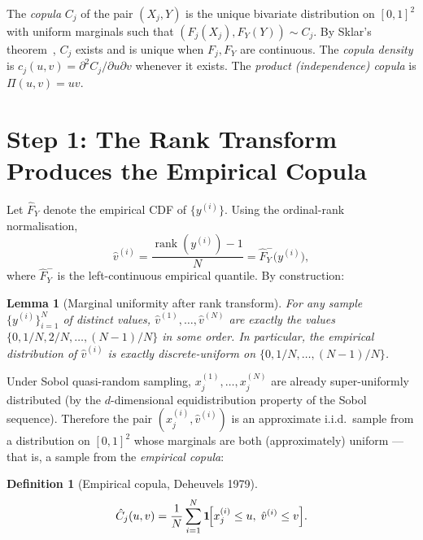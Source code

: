 \documentclass[11pt,a4paper]{article}
\newtheorem{lemma}[theorem]{Lemma}
\theoremstyle{definition}
\newtheorem{definition}[theorem]{Definition}
\newcommand{\Ind}{\mathbf{1}}
\DeclareMathOperator{\rank}{rank}
\begin{document}
\begin{tcolorbox}[colback=blue!4, colframe=blue!30, title=Notation for copulas]
The \emph{copula} $C_j$ of the pair $(X_j, Y)$ is the unique bivariate
distribution on $[0,1]^2$ with uniform marginals such that
$(F_j(X_j), F_Y(Y)) \sim C_j$.  By Sklar's theorem~\cite{sklar1959}, $C_j$ exists and is
unique when $F_j, F_Y$ are continuous.  The \emph{copula density} is
$c_j(u,v) = \partial^2 C_j / \partial u \partial v$ whenever it exists.
The \emph{product (independence) copula} is $\Pi(u,v) = uv$.
\end{tcolorbox}

\section{Step 1: The Rank Transform Produces the Empirical Copula}

Let $\hat{F}_Y$ denote the empirical CDF of $\{y^{(i)}\}$.  Using the
ordinal-rank normalisation,
\[
  \hat{v}^{(i)} = \frac{\rank(y^{(i)}) - 1}{N}
                = \hat{F}_Y^{-}\!\bigl(y^{(i)}\bigr),
\]
where $\hat{F}_Y^{-}$ is the left-continuous empirical quantile.  By
construction:

\begin{lemma}[Marginal uniformity after rank transform]
\label{lem:marginals}
For any sample $\{y^{(i)}\}_{i=1}^N$ of distinct values,
$\hat{v}^{(1)}, \ldots, \hat{v}^{(N)}$ are exactly the values
$\{0, 1/N, 2/N, \ldots, (N-1)/N\}$ in some order.  In particular, the
empirical distribution of $\hat{v}^{(i)}$ is exactly discrete-uniform on
$\{0, 1/N, \ldots, (N-1)/N\}$.
\end{lemma}

Under Sobol quasi-random sampling, $x_j^{(1)},\ldots,x_j^{(N)}$ are
already super-uniformly distributed (by the $d$-dimensional equidistribution
property of the Sobol sequence).  Therefore the pair
$(x_j^{(i)}, \hat{v}^{(i)})$ is an approximate i.i.d.\ sample from a
distribution on $[0,1]^2$ whose marginals are both (approximately) uniform
— that is, a sample from the \emph{empirical copula}:

\begin{definition}[Empirical copula, Deheuvels 1979]
\[
  \hat{C}_j(u,v)
  = \frac{1}{N}\sum_{i=1}^N
    \Ind\!\Bigl[x_j^{(i)} \le u,\; \hat{v}^{(i)} \le v\Bigr].
\]
\end{definition}
\end{document}
